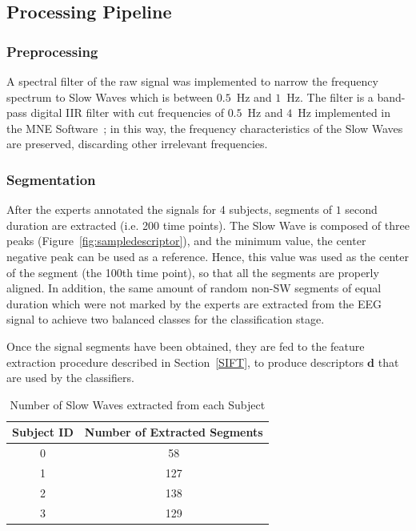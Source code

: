 \documentclass[review]{elsarticle}
\begin{document}
\subsection{Processing Pipeline}

\subsubsection{Preprocessing}
\label{peprocessing}



A spectral filter of the raw signal was implemented to narrow the frequency spectrum to Slow Waves which is between $0.5$~Hz and $1$~Hz. The filter is a band-pass digital IIR filter with cut frequencies of $0.5$~Hz and $4$~Hz implemented in the MNE Software~\cite{Gramfort2013}; in this way, the frequency characteristics of the Slow Waves are preserved, discarding other irrelevant frequencies.



\subsubsection{Segmentation}
\label{featurextraction}

After the experts annotated the signals for 4 subjects, segments of $1$ second duration are extracted (i.e. 200 time points).  The Slow Wave is composed of three peaks (Figure~\ref{fig:sampledescriptor}), and the minimum value, the center negative peak can be used as a reference.  Hence, this value was used as the center of the segment (the 100th time point), so that all the segments are properly aligned.   In addition, the same amount of random non-SW segments of equal duration which were not marked by the experts are extracted from the EEG signal to achieve two balanced classes for the classification stage.

Once the signal segments have been obtained, they are fed to the feature extraction procedure described in Section~\ref{SIFT}, to produce descriptors $\mathbf{d}$ that are used by the classifiers.

\begin{table}[htb]
\caption{Number of Slow Waves extracted from each Subject}
\centering
\vspace{8pt}
\begin{tabular}{|c|c|}
\toprule
Subject ID	&   Number of Extracted Segments   \\
\midrule
0     &     58   \\
1    &     127     \\
2     &     138   \\
3     &     129     \\
\bottomrule
\end{tabular}
\label{tab:precisiony}
\end{table}
\end{document}
